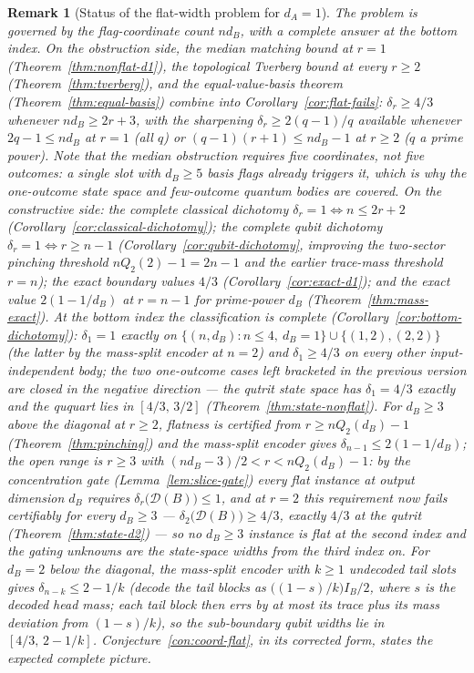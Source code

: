\documentclass[11pt,a4paper]{article}
\newtheorem{remark}[theorem]{Remark}
\begin{document}
\begin{remark}[Status of the flat-width problem for $d_A=1$]
\label{rem:flat-status}
The problem is governed by the flag-coordinate count $nd_B$, with a complete answer
at the bottom index. On the obstruction side,
the median matching bound at $r=1$ (Theorem~\ref{thm:nonflat-d1}), the topological
Tverberg bound at every $r\ge2$ (Theorem~\ref{thm:tverberg}), and the
equal-value-basis theorem (Theorem~\ref{thm:equal-basis}) combine into
Corollary~\ref{cor:flat-fails}: $\delta_r\ge4/3$ whenever $nd_B\ge2r+3$, with the
sharpening $\delta_r\ge2(q-1)/q$ available whenever $2q-1\le nd_B$ at $r=1$ (all $q$)
or $(q-1)(r+1)\le nd_B-1$ at $r\ge2$ ($q$ a prime power). Note that the median
obstruction requires five \emph{coordinates}, not five outcomes: a single slot with
$d_B\ge5$ basis flags already triggers it, which is why the one-outcome state space
and few-outcome quantum bodies are covered. On the constructive side:
the complete classical dichotomy $\delta_r=1\iff n\le2r+2$
(Corollary~\ref{cor:classical-dichotomy}); the complete qubit dichotomy
$\delta_r=1\iff r\ge n-1$ (Corollary~\ref{cor:qubit-dichotomy}, improving the
two-sector pinching threshold $nQ_2(2)-1=2n-1$ and the earlier trace-mass threshold
$r=n$); the exact boundary values $4/3$ (Corollary~\ref{cor:exact-d1}); and the exact
value $2(1-1/d_B)$ at $r=n-1$ for prime-power $d_B$ (Theorem~\ref{thm:mass-exact}).
At the bottom index the classification is complete
(Corollary~\ref{cor:bottom-dichotomy}): $\delta_1=1$ exactly on
$\{(n,d_B):n\le4,\ d_B=1\}\cup\{(1,2),(2,2)\}$ (the latter by the mass-split encoder
at $n=2$) and $\delta_1\ge4/3$ on every other input-independent body; the two
one-outcome cases left bracketed in the previous version are closed in the negative
direction --- the qutrit state space has $\delta_1=4/3$ exactly and the ququart lies in
$[4/3,\,3/2]$ (Theorem~\ref{thm:state-nonflat}). For $d_B\ge3$ above the diagonal at
$r\ge2$, flatness is certified from
$r\ge nQ_2(d_B)-1$ (Theorem~\ref{thm:pinching}) and the mass-split encoder gives
$\delta_{n-1}\le2(1-1/d_B)$; the open range is $r\ge3$ with $(nd_B-3)/2<r<nQ_2(d_B)-1$: by the concentration gate (Lemma~\ref{lem:slice-gate}) every flat instance at output dimension $d_B$ requires $\delta_r\bigl(\mathcal D(B)\bigr)\le1$, and at $r=2$ this requirement now fails certifiably for every $d_B\ge3$ --- $\delta_2\bigl(\mathcal D(B)\bigr)\ge4/3$, exactly $4/3$ at the qutrit (Theorem~\ref{thm:state-d2}) --- so no $d_B\ge3$ instance is flat at the second index and the gating unknowns are the state-space widths from the third index on. For $d_B=2$
below the diagonal, the mass-split encoder with $k\ge1$ undecoded tail slots gives
$\delta_{n-k}\le2-1/k$ (decode the tail blocks as $\big((1-s)/k\big)I_B/2$, where $s$
is the decoded head mass; each tail block then errs by at most its trace plus its mass
deviation from $(1-s)/k$), so the sub-boundary qubit widths lie in $[4/3,\,2-1/k]$.
Conjecture~\ref{con:coord-flat}, in its corrected form, states the expected complete
picture.
\end{remark}
\end{document}
